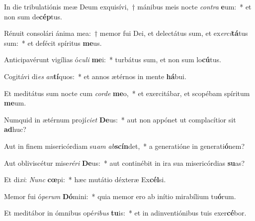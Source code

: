 \item In die tribulatiónis meæ Deum exquisívi,~† mánibus meis nocte \textit{con}\textit{tra} \textbf{e}um:~* et non sum de\textbf{cép}tus.
\item Rénuit consolári ánima mea:~† memor fui Dei, et delectátus sum, et ex\textit{er}\textit{ci}\textbf{tá}tus sum:~* et defécit spíritus \textbf{me}us.
\item Anticipavérunt vigílias ó\textit{cu}\textit{li} \textbf{me}i:~* turbátus sum, et non sum lo\textbf{cú}tus.
\item Cogitávi di\textit{es} \textit{an}\textbf{tí}quos:~* et annos ætérnos in mente \textbf{há}bui.
\item Et meditátus sum nocte cum \textit{cor}\textit{de} \textbf{me}o,~* et exercitábar, et scopébam spíritum \textbf{me}um.
\item Numquid in ætérnum projí\textit{ci}\textit{et} \textbf{De}us:~* aut non appónet ut complacítior sit \textbf{ad}huc?
\item Aut in finem misericórdiam su\textit{am} \textit{ab}\textbf{scín}det,~* a generatióne in generati\textbf{ó}nem?
\item Aut obliviscétur mise\textit{ré}\textit{ri} \textbf{De}us:~* aut continébit in ira sua misericórdias \textbf{su}as?
\item Et di\textit{xi}: \textit{Nunc} \textbf{cœ}pi:~* hæc mutátio déxteræ Ex\textbf{cél}si.
\item Memor fui ó\textit{pe}\textit{rum} \textbf{Dó}mini:~* quia memor ero ab inítio mirabílium tu\textbf{ó}rum.
\item Et meditábor in ómnibus opé\textit{ri}\textit{bus} \textbf{tu}is:~* et in adinventiónibus tuis exer\textbf{cé}bor.
